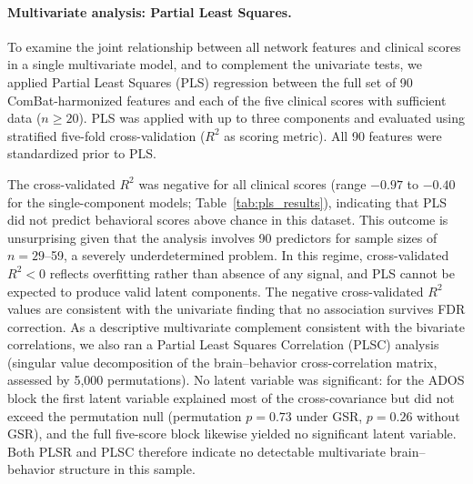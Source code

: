 \documentclass[10pt,letterpaper]{article}
\begin{document}
\paragraph*{Multivariate analysis: Partial Least Squares.}
To examine the joint relationship between all network features and clinical scores in a single
multivariate model, and to complement the univariate tests, we applied Partial Least Squares (PLS)
regression \cite{Krishnan2011} between the full set of 90 ComBat-harmonized features and each of
the five clinical scores with sufficient data ($n \geq 20$). PLS was applied with up to three
components and evaluated using stratified five-fold cross-validation ($R^2$ as scoring metric).
All 90 features were standardized prior to PLS.

The cross-validated $R^2$ was negative for all clinical scores (range $-0.97$ to $-0.40$ for the
single-component models; Table~\ref{tab:pls_results}), indicating that PLS did not predict
behavioral scores above chance in this dataset. This outcome is unsurprising given that the
analysis involves 90 predictors for sample sizes of $n = 29$--59, a severely underdetermined
problem. In this regime, cross-validated $R^2 < 0$ reflects overfitting rather than absence of
any signal, and PLS cannot be expected to produce valid latent components. The negative cross-validated
$R^2$ values are consistent with the univariate finding that no association survives FDR correction.
As a descriptive multivariate complement consistent with the bivariate correlations, we also ran a
Partial Least Squares Correlation (PLSC) analysis \cite{Krishnan2011} (singular value decomposition
of the brain--behavior cross-correlation matrix, assessed by 5{,}000 permutations). No latent
variable was significant: for the ADOS block the first latent variable explained most of the
cross-covariance but did not exceed the permutation null (permutation $p = 0.73$ under GSR,
$p = 0.26$ without GSR), and the full five-score block likewise yielded no significant latent
variable. Both PLSR and PLSC therefore indicate no detectable multivariate brain--behavior structure
in this sample.
\end{document}
